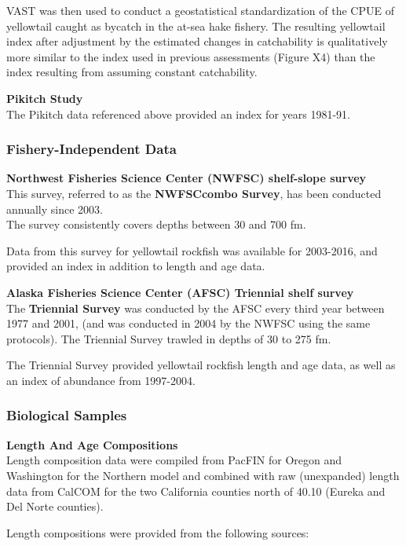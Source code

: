 \documentclass[12pt,]{article}
\begin{document}
VAST was then used to conduct a geostatistical standardization of the
CPUE of yellowtail caught as bycatch in the at-sea hake fishery. The
resulting yellowtail index after adjustment by the estimated changes in
catchability is qualitatively more similar to the index used in previous
assessments (Figure X4) than the index resulting from assuming constant
catchability.

\textbf{Pikitch Study}\\
The Pikitch data referenced above provided an index for years 1981-91.

\subsubsection{Fishery-Independent Data}\label{fishery-independent-data}

\textbf{Northwest Fisheries Science Center (NWFSC) shelf-slope survey}\\
This survey, referred to as the \textbf{NWFSCcombo Survey}, has been
conducted annually since 2003.\\
The survey consistently covers depths between 30 and 700 fm.

Data from this survey for yellowtail rockfish was available for
2003-2016, and provided an index in addition to length and age data.

\textbf{Alaska Fisheries Science Center (AFSC) Triennial shelf survey}\\
The \textbf{Triennial Survey} was conducted by the AFSC every third year
between 1977 and 2001, (and was conducted in 2004 by the NWFSC using the
same protocols). The Triennial Survey trawled in depths of 30 to 275 fm.

The Triennial Survey provided yellowtail rockfish length and age data,
as well as an index of abundance from 1997-2004.

\subsubsection{Biological Samples}\label{biological-samples}

\textbf{Length And Age Compositions}\\
Length composition data were compiled from PacFIN for Oregon and
Washington for the Northern model and combined with raw (unexpanded)
length data from CalCOM for the two California counties north of 40.10
(Eureka and Del Norte counties).

Length compositions were provided from the following sources:
\end{document}
